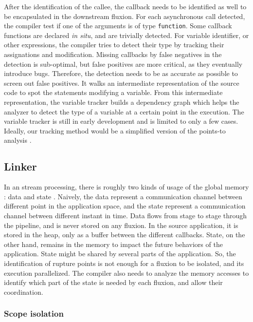 After the identification of the callee, the callback needs to be identified as well to be encapsulated in the downstream fluxion.
For each asynchronous call detected, the compiler test if one of the arguments is of type \texttt{function}.
Some callback functions are declared \textit{in situ}, and are trivially detected.
For variable identifier, or other expressions, the compiler tries to detect their type by tracking their assignations and modification.
Missing callbacks by false negatives in the detection is sub-optimal, but false positives are more critical, as they eventually introduce bugs.
Therefore, the detection needs to be as accurate as possible to screen out false positives.
It walks an intermediate representation of the source code to spot the statements modifying a variable.
From this intermediate representation, the variable tracker builds a dependency graph which helps the analyzer to detect the type of a variable at a certain point in the execution.
The variable tracker is still in early development and is limited to only a few cases.
Ideally, our tracking method would be a simplified version of the points-to analysis \cite{Wei2014}.

\subsection{Linker} \label{section:compiler:linker}

In an stream processing, there is roughly two kinds of usage of the global memory : data and state \cite{Fernandez2014a}.
Naively, the data represent a communication channel between different point in the application space, and the state represent a communication channel between different instant in time.
Data flows from stage to stage through the pipeline, and is never stored on any fluxion. In the source application, it is stored in the heap, only as a buffer between the different callbacks.
State, on the other hand, remains in the memory to impact the future behaviors of the application.
State might be shared by several parts of the application.
So, the identification of rupture points is not enough for a fluxion to be isolated, and its execution parallelized.
The compiler also needs to analyze the memory accesses to identify which part of the state is needed by each fluxion, and allow their coordination.

\subsubsection{Scope isolation}

